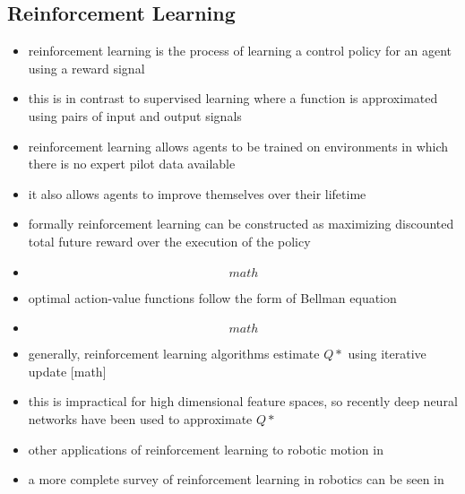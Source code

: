 \documentclass[paper=a4, fontsize=11pt]{scrartcl} %
\begin{document}
	\subsection{Reinforcement Learning}
	\begin{itemize}
		\item reinforcement learning is the process of learning a control policy for an agent using a reward signal
		\item this is in contrast to supervised learning where a function is approximated using pairs of input and output signals
		\item reinforcement learning allows agents to be trained on environments in which there is no expert pilot data available
		\item it also allows agents to improve themselves over their lifetime \cite{thrun1995lifelong}

		\item formally reinforcement learning can be constructed as maximizing discounted total future reward over the execution of the policy
		\item \[math\]
		\item optimal action-value functions follow the form of Bellman equation
		\item \[math\]
		\item generally, reinforcement learning algorithms estimate $Q*$ using iterative update [math] \cite{Sutton:1998:IRL:551283}
		\item this is impractical for high dimensional feature spaces, so recently deep neural networks have been used to approximate $Q*$ \cite{Mnih2013}
		\item other applications of reinforcement learning to robotic motion in \cite{DBLP:conf/icra/KohlS04,DBLP:conf/iros/TedrakeZS04,geng2005fast,bagnell2001autonomous, riedmiller2009reinforcement}
		\item a more complete survey of reinforcement learning in robotics can be seen in \cite{kober2013reinforcement}
	\end{itemize}
\end{document}
